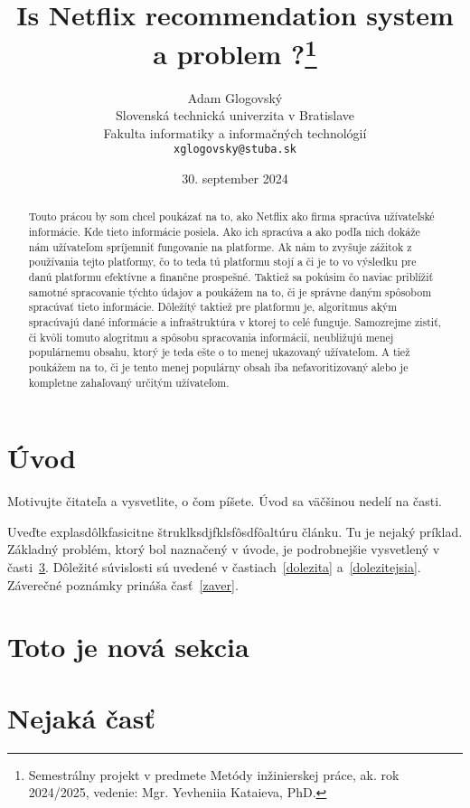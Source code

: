 \documentclass[10pt,twoside,slovak,a4paper]{coursepaper}
\title{Is Netflix recommendation system a problem ?\thanks{Semestrálny projekt v predmete Metódy inžinierskej práce, ak. rok 2024/2025, vedenie: Mgr. Yevheniia Kataieva, PhD.}}
\author{Adam Glogovský\\[2pt]
	{\small Slovenská technická univerzita v Bratislave}\\
	{\small Fakulta informatiky a informačných technológií}\\
	{\small \texttt{xglogovsky@stuba.sk}}
	}
\date{\small 30. september 2024} %
\begin{document}
\maketitle

\begin{abstract}
	Touto prácou by som chcel poukázať na to, ako Netflix ako firma spracúva užívateľské informácie. Kde tieto informácie posiela. Ako ich spracúva a ako podľa nich dokáže nám užívateľom spríjemniť fungovanie na platforme. Ak nám to zvyšuje zážitok z používania tejto platformy, čo to teda tú platformu stojí a či je to vo výsledku pre danú platformu efektívne a finančne prospešné. Taktiež sa pokúsim čo naviac priblížiť samotné spracovanie týchto údajov a poukážem na to, či je správne daným spôsobom spracúvať tieto informácie.\cite{amatriain2015recommender} Dôležítý taktiež pre platformu je, algoritmus akým spracúvajú dané informácie a infraštruktúra v ktorej to celé funguje. Samozrejme zistiť, či kvôli tomuto alogritmu a spôsobu spracovania informácií, neubližujú menej populárnemu obsahu, ktorý je teda ešte o to menej ukazovaný užívateľom. A tiež poukážem na to, či je tento menej populárny obsah iba nefavoritizovaný alebo je kompletne zahaľovaný určitým užívateľom.
\end{abstract}



\section{Úvod}

Motivujte čitateľa a vysvetlite, o čom píšete. Úvod sa väčšinou nedelí na časti.

Uveďte explasdôlkfasicitne štruklksdjfklsfôsdfôaltúru článku. Tu je nejaký príklad.
Základný problém, ktorý bol naznačený v úvode, je podrobnejšie vysvetlený v časti~\ref{nejaka}.
Dôležité súvislosti sú uvedené v častiach~\ref{dolezita} a~\ref{dolezitejsia}.
Záverečné poznámky prináša časť~\ref{zaver}.

\section{Toto je nová sekcia} \label{pouziva sa pre referencie}



\section{Nejaká časť} \label{nejaka}
\end{document}
